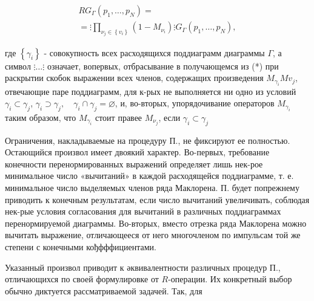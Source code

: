 \documentclass[10pt]{article}
\begin{document}
\[
\begin{gathered}
R G_{\Gamma}\left(p_{1}, \ldots, p_{N}\right)= \\
=\vdots \prod_{\nu_{j} \in\left\{v_{i}\right\}}\left(1-M_{\nu_{i}}\right) \vdots G_{\Gamma}\left(p_{1}, \ldots, p_{N}\right),
\end{gathered}
\]

где $\left\{\gamma_{i}\right\}$ - совокупность всех расходящихся поддиаграмм диаграммы $\Gamma$, а символ $\vdots \ldots \vdots$ означает, вопервых, отбрасывание в получающемся из (*) при раскрытии скобок выражении всех членов, содержащих произведения $M_{\gamma_{i}} M v_{j}$, отвечающие паре поддиаграмм, для к-рых не выполняется ни одно из условий $\gamma_{i} \subset \gamma_{j}$, $\gamma_{i} \supset \gamma_{j}, \quad \gamma_{i} \cap \gamma_{j}=\varnothing$, и, во-вторых, упорядочивание операторов $M_{\gamma_{i}}$ таким образом, что $M_{\gamma_{i}}$ стоит правее $M_{\nu_{j}}$, если $\gamma_{i} \subset \gamma_{j}$

Ограничения, накладываемые на процедуру П., не фиксируют ее полностью. Остающийся произвол имеет двоякий характер. Во-первых, требование конечности перенормированных выражений определяет лишь нек-рое минимальное число «вычитаний» в каждой расходящейся поддиаграмме, т. е. минимальное число выделяемых членов ряда Маклорена. П. будет попрежнему приводить к конечным результатам, если число вычитаний увеличивать, соблюдая нек-рые условия согласования для вычитаний в различных поддиаграммах перенормируемой диаграммы. Во-вторых, вместо отрезка ряда Маклорена можно вычитать выражение, отличающееся от него многочленом по импульсам той же степени с конечными кођфффициентами.

Указанный произвол приводит к әквивалентности различных процедур П., отличающихся по своей формулировке от $R$-операции. Их конкретный выбор обычно диктуется рассматриваемой задачей. Так, для
\end{document}
